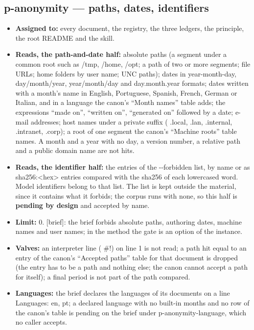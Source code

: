 \documentclass[
  american,
  10pt,
]{report}
\newcounter{none} %
\providecommand{\tightlist}{%
  \setlength{\itemsep}{0pt}\setlength{\parskip}{0pt}}
\renewcommand{\texttt}[1]{{\ttfamily\hyphenchar\font=-1 #1}}
\begin{document}
\subsection{\texorpdfstring{\texttt{p-\allowbreak{}anonymity} --- paths,
dates,
identifiers}{ --- paths, dates, identifiers}}\label{p-anonymity-paths-dates-identifiers}

\begin{itemize}
\tightlist
\item
  \textbf{Assigned to:} every document, the registry, the three ledgers,
  the principle, the root README and the skill.
\item
  \textbf{Reads, the path-and-date half:} absolute paths (a segment
  under a common root such as \texttt{/\allowbreak{}tmp},
  \texttt{/\allowbreak{}home}, \texttt{/\allowbreak{}opt}; a path of two
  or more segments; file URLs; home folders by user name; UNC paths);
  dates in year-month-day, day/month/year, year/month/day and
  day.month.year formats; dates written with a month's name in English,
  Portuguese, Spanish, French, German or Italian, and in a language the
  canon's ``Month names'' table adds; the expressions ``made on'',
  ``written on'', ``generated on'' followed by a date; e-mail addresses;
  host names under a private suffix (\texttt{.\allowbreak{}local},
  \texttt{.\allowbreak{}lan}, \texttt{.\allowbreak{}internal},
  \texttt{.\allowbreak{}intranet}, \texttt{.\allowbreak{}corp}); a root
  of one segment the canon's ``Machine roots'' table names. A month and
  a year with no day, a version number, a relative path and a public
  domain name are not hits.
\item
  \textbf{Reads, the identifier half:} the entries of the
  \texttt{-\allowbreak{}-\allowbreak{}forbidden} list, by name or as
  \texttt{sha256:\allowbreak{}<hex>} entries compared with the sha256 of
  each lowercased word. Model identifiers belong to that list. The list
  is kept outside the material, since it contains what it forbids; the
  corpus runs with none, so this half is \textbf{pending by design} and
  accepted by name.
\item
  \textbf{Limit:} 0. \texttt{[brief]}: the brief forbids absolute paths,
  authoring dates, machine names and user names; in the method the gate
  is an option of the instance.
\item
  \textbf{Valves:} an interpreter line (\texttt{\#!}) on line 1 is not
  read; a path hit equal to an entry of the canon's ``Accepted paths''
  table for that document is dropped (the entry has to be a path and
  nothing else; the canon cannot accept a path for itself); a final
  period is not part of the path compared.
\item
  \textbf{Languages:} the brief declares the languages of its documents
  on a line \texttt{Languages:\allowbreak{} en, pt}; a declared language
  with no built-in months and no row of the canon's table is pending on
  the brief under
  \texttt{p-\allowbreak{}anonymity-\allowbreak{}language}, which no
  caller accepts.
\end{itemize}
\end{document}
